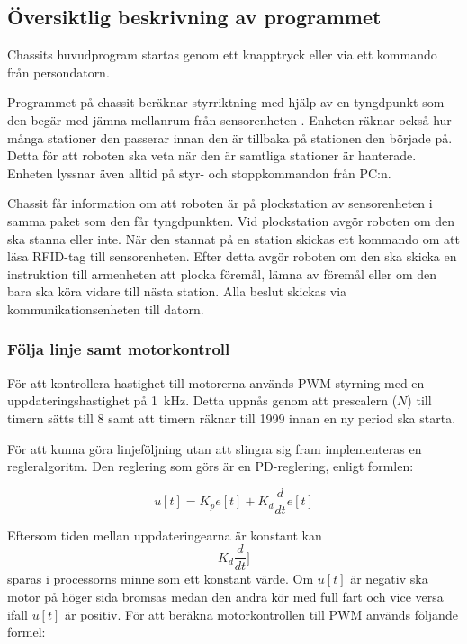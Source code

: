 \subsection{Översiktlig beskrivning av programmet}

 Chassits huvudprogram startas genom ett knapptryck eller via ett kommando från persondatorn. 

Programmet på chassit beräknar styrriktning med hjälp av en tyngdpunkt som den begär med jämna mellanrum från sensorenheten . Enheten räknar också hur många stationer den passerar innan den är tillbaka på stationen den började på. Detta för att roboten ska veta när den är samtliga stationer är hanterade. Enheten lyssnar även alltid på styr- och stoppkommandon från PC:n.

Chassit får information om att roboten är på plockstation av sensorenheten i samma paket som den får tyngdpunkten. Vid plockstation avgör roboten om den ska stanna eller inte. När den stannat på en station skickas ett kommando om att läsa RFID-tag till sensorenheten. Efter detta avgör roboten om den ska skicka en instruktion till armenheten att  plocka föremål, lämna av föremål eller om den bara ska köra vidare till nästa station. Alla beslut skickas via kommunikationsenheten till datorn.


\subsubsection{Följa linje samt motorkontroll}
\label{följalinje}

För att kontrollera hastighet till motorerna används PWM-styrning med en uppdateringshastighet på 1~kHz. Detta uppnås genom att prescalern ($N$) till timern sätts till 8 samt att timern räknar till 1999 innan en ny period ska starta. 

För att kunna göra linjeföljning utan att slingra sig fram implementeras en regleralgoritm. Den reglering som görs är en PD-reglering, enligt formlen:

$$u[t] = K_{p}e[t] + K_{d}\frac{d}{dt}e[t]$$

Eftersom tiden mellan uppdateringearna är konstant kan $$ K_{d}\frac{d}{dt}]$$ sparas i processorns minne som ett konstant värde. Om $u[t]$ är negativ ska motor på höger sida  bromsas medan den andra kör med full fart och vice versa ifall $u[t]$ är positiv. För att beräkna motorkontrollen till PWM används följande formel:

